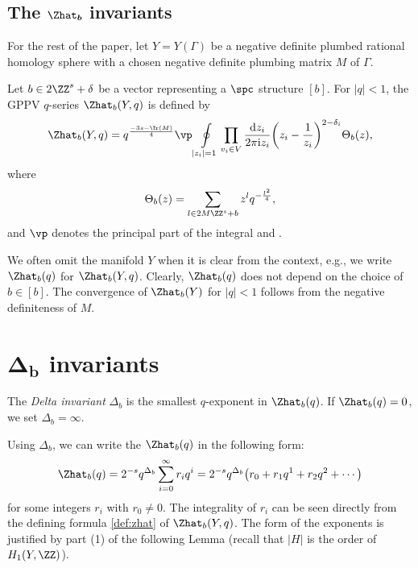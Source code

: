 \documentclass[10pt,a4paper]{amsart}
\begin{document}
\subsection[The Zhat\_b invariants]{The $\boldsymbol{\Zhat_b}$ invariants}

For the rest of the paper, let $Y = Y(\Gamma)$ be a negative definite plumbed rational homology sphere with a chosen negative definite plumbing matrix $M$ of $\Gamma$.

\begin{Definition}
Let $b \in 2\ZZ^s + \delta$ be a vector representing a $\spc$ structure $[b]$. For $\lvert q \rvert<1$, the GPPV $q$-series $\Zhat_b(Y,q)$ is defined by
\begin{equation}\label{def:zhat}
 \Zhat_b(Y,q) = q^{\frac{-3s - \Tr(M)}{4}} \vp\oint\limits_{\lvert z_i \rvert = 1}\prod_{v_i\in V} \frac{{\rm d}z_i}{2\pi {\rm i} z_i} \biggl(z_i - \frac{1}{z_i}\biggr)^{2-\delta_i} \Theta_{b}(z),
\end{equation}
where
\begin{equation}\label{eq:theta}
 \Theta_{b}(z) = \sum_{l \in 2M\ZZ^s + b} z^l q^{-\frac{l^2}{4}},
\end{equation}
and $\vp$ denotes the principal part of the integral and .
\end{Definition}

We often omit the manifold $Y$ when it is clear from the context, e.g., we write~$\Zhat_b(q)$ for $\Zhat_b(Y,q)$. Clearly, $\Zhat_b(q)$ does not depend on the choice of $b \in [b]$. The convergence of $\Zhat_b(Y)$ for $\lvert q \rvert<1$ follows from the negative definiteness of $M$.


\section[Delta\_b invariants]{$\boldsymbol{\Delta_b}$ invariants}

\begin{Definition}
The \emph{Delta invariant} $\Delta_b$ is the smallest $q$-exponent in $\Zhat_b(q)$. If $\Zhat_b(q) = 0$, we set $\Delta_b = \infty$.
\end{Definition}

Using $\Delta_b$, we can write the $\Zhat_b(q)$ in the following form:
\[
 \Zhat_b(q) = 2^{-s} q^{\Delta_b}\sum_{i=0}^\infty r_iq^i = 2^{-s} q^{\Delta_b}\bigl(r_0 + r_1q^1 + r_2q^2 + \cdots\bigr)
\]
for some integers $r_i$ with $r_0 \neq 0$. The integrality of $r_i$ can be seen directly from the defining formula \eqref{def:zhat} of $\Zhat_b(Y,q)$. The form of the exponents is justified by part (1) of the following Lemma (recall that $\lvert H\rvert$ is the order of $H_1(Y,\ZZ)$).
\end{document}
